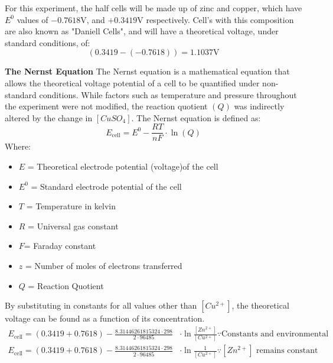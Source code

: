 \documentclass[11pt,a4paper]{article}
\begin{document}
	For this experiment, the half cells will be made up of zinc and copper, which have $E^0$ values of $-0.7618$V, and $+0.3419$V respectively. Cell's with this composition are also known as "Daniell Cells", and will have a theoretical voltage, under standard conditions, of: $$(0.3419-(-0.7618))=1.1037\textrm{V}$$
	
	

	\textbf{The Nernst Equation}\newline
	The Nernst equation is a mathematical equation that allows the theoretical voltage potential of a cell to be quantified under non-standard conditions. While factors such as temperature and pressure throughout the experiment were not modified, the reaction quotient $(Q)$ was indirectly altered by the change in $[CuSO_4]$. 
\newline The Nernst equation is defined as:
	$$
	E_{\textrm{cell}}=E^0 - \frac{RT}{nF}\cdot \ln(Q)
	$$
	Where:
	\begin{itemize}
		\item $E$ = Theoretical electrode potential (voltage)of the cell
		\item $E^0$ = Standard electrode potential of the cell
		\item $T$ = Temperature in kelvin 
		\item $R$ = Universal gas constant
		\item $F$= Faraday constant
		\item $z$ = Number of moles of electrons transferred
		\item $Q$ = Reaction Quotient
		

	\end{itemize}
By substituting in constants for all values other than $[Cu^{2+}]$, the theoretical voltage can be found as a function of its concentration.  
\begin{align*}
E_{\textrm{cell}}=(0.3419+0.7618)-\frac{8.31446261815324\cdot298}{2\cdot96485}&\cdot\ln\frac{[Zn^{2+}]}{[Cu^{2+}]}\because \textrm{Constants and environmental conditions}\\
E_{\textrm{cell}}=(0.3419+0.7618)-\frac{8.31446261815324\cdot298}{2\cdot96485}&\cdot\ln\frac{1}{[Cu^{2+}]} \because [Zn^{2+}]\textrm{ remains constant}
\end{align*}
\end{document}
